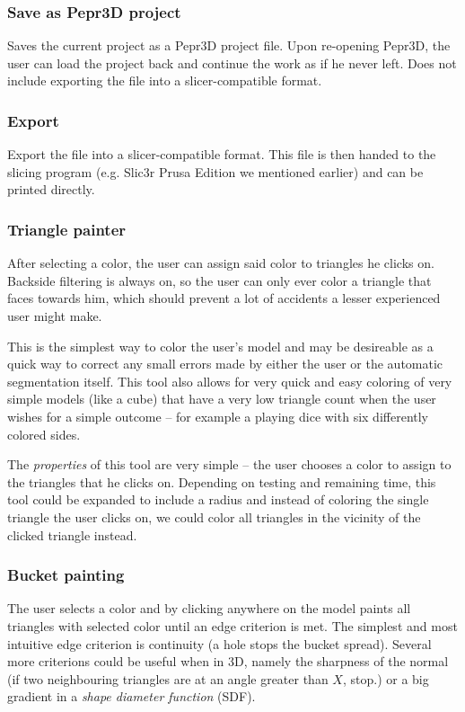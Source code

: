 \subsubsection{Save as Pepr3D project}
Saves the current project as a Pepr3D project file. Upon re-opening Pepr3D, the user can load the project back and continue the work as if he never left. Does not include exporting the file into a slicer-compatible format.

\subsubsection{Export}
Export the file into a slicer-compatible format. This file is then handed to the slicing program (e.g. Slic3r Prusa Edition we mentioned earlier) and can be printed directly.

\subsubsection{Triangle painter}
After selecting a color, the user can assign said color to triangles he clicks on. Backside filtering is always on, so the user can only ever color a triangle that faces towards him, which should prevent a lot of accidents a lesser experienced user might make.

This is the simplest way to color the user's model and may be desireable as a quick way to correct any small errors made by either the user or the automatic segmentation itself. This tool also allows for very quick and easy coloring of very simple models (like a cube) that have a very low triangle count when the user wishes for a simple outcome -- for example a playing dice with six differently colored sides.

The \textit{properties} of this tool are very simple -- the user chooses a color to assign to the triangles that he clicks on. Depending on testing and remaining time, this tool could be expanded to include a radius and instead of coloring the single triangle the user clicks on, we could color all triangles in the vicinity of the clicked triangle instead.

\subsubsection{Bucket painting}
The user selects a color and by clicking anywhere on the model paints all triangles with selected color until an edge criterion is met. The simplest and most intuitive edge criterion is continuity (a hole stops the bucket spread). Several more criterions could be useful when in 3D, namely the sharpness of the normal (if two neighbouring triangles are at an angle greater than $X$, stop.) or a big gradient in a \textit{shape diameter function} (SDF).

